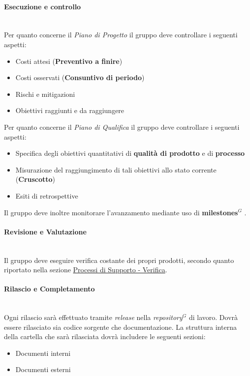 \paragraph{Esecuzione e controllo}
\mbox{} \\
Per quanto concerne il \textit{Piano di Progetto} il gruppo deve controllare i seguenti aspetti:
\begin{itemize}
    \item Costi attesi (\textbf{Preventivo a finire})
    \item Costi osservati (\textbf{Consuntivo di periodo})
    \item Rischi e mitigazioni
    \item Obiettivi raggiunti e da raggiungere
\end{itemize}
Per quanto concerne il \textit{Piano di Qualifica} il gruppo deve controllare i seguenti aspetti:
\begin{itemize}
    \item Specifica degli obiettivi quantitativi di \textbf{qualità di prodotto} e di \textbf{processo}
    \item Misurazione del raggiungimento di tali obiettivi allo stato corrente (\textbf{Cruscotto})
    \item Esiti di retrospettive
\end{itemize}

Il gruppo deve inoltre monitorare l'avanzamento mediante uso di \textbf{milestones}$^G$ .

\paragraph{Revisione e Valutazione}
\mbox{} \\
Il gruppo deve eseguire verifica costante dei propri prodotti, secondo quanto riportato nella sezione \hyperref[sec:Verifica]{Processi di Supporto - Verifica}.

\paragraph{Rilascio e Completamento}
\mbox{} \\
Ogni rilascio sarà effettuato tramite \textit{release} nella \textit{repository}$^G$  di lavoro.
Dovrà essere rilasciato sia codice sorgente che documentazione.
La struttura interna della cartella che sarà rilasciata dovrà includere le seguenti sezioni:
\begin{itemize}
    \item Documenti interni
    \item Documenti esterni
\end{itemize}

